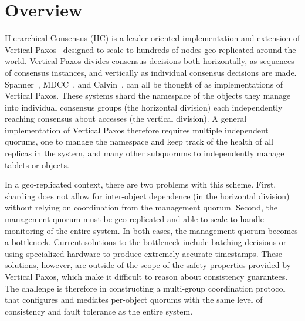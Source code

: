 \section{Overview}
\label{ch03_overview}

Hierarchical Consensus (HC) is a leader-oriented implementation and extension of Vertical Paxos~\cite{vertical_paxos,boxwood,niobe} designed to scale to hundreds of nodes geo-replicated around the world.
Vertical Paxos divides consensus decisions both horizontally, as sequences of consensus instances, and vertically as individual consensus decisions are made.
Spanner~\cite{spanner}, MDCC~\cite{mdcc}, and Calvin~\cite{calvindb}, can all be thought of as implementations of Vertical Paxos.
These systems shard the namespace of the objects they manage into individual consensus groups (the horizontal division) each independently reaching consensus about accesses (the vertical division).
A general implementation of Vertical Paxos therefore requires multiple independent quorums, one to manage the namespace and keep track of the health of all replicas in the system, and many other subquorums to independently manage tablets or objects.

In a geo-replicated context, there are two problems with this scheme.
First, sharding does not allow for inter-object dependence (in the horizontal division) without relying on coordination from the management quorum.
Second, the management quorum must be geo-replicated and able to scale to handle monitoring of the entire system.
In both cases, the management quorum becomes a bottleneck.
Current solutions to the bottleneck include batching decisions or using specialized hardware to produce extremely accurate timestamps.
These solutions, however, are outside of the scope of the safety properties provided by Vertical Paxos, which make it difficult to reason about consistency guarantees.
The challenge is therefore in constructing a multi-group coordination protocol that configures and mediates per-object quorums with the same level of consistency and fault tolerance as the entire system.


